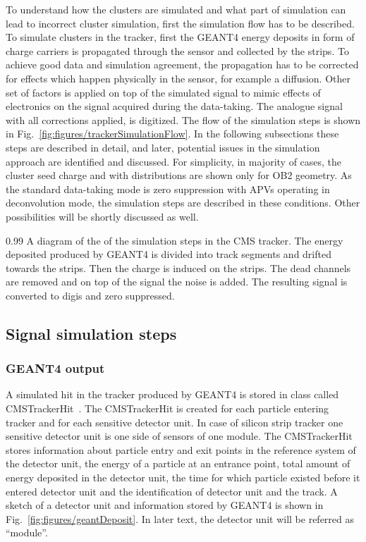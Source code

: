 To understand how the clusters are simulated and what part of simulation can lead to incorrect cluster simulation, first the simulation flow has to be described. To simulate clusters in the tracker, first the GEANT4 energy deposits in form of charge carriers is propagated through the sensor and collected by the strips. To achieve good data and simulation agreement, the propagation has to be corrected for effects which happen physically in the sensor, for example a diffusion. Other set of factors is applied on top of the simulated signal to mimic effects of electronics on the signal acquired during the data-taking. The analogue signal with all corrections applied, is digitized. The flow of the simulation steps is shown in Fig.~\ref{fig:figures/trackerSimulationFlow}. In the following subsections these steps are described in detail, and later, potential issues in the simulation approach are identified and discussed. For simplicity, in majority of cases, the cluster seed charge and with distributions are shown only for OB2 geometry. As the standard data-taking mode is zero suppression with APVs operating in deconvolution mode, the simulation steps are described in these conditions. Other possibilities will be shortly discussed as well.

                 {0.99}       %
                 { A diagram of the of the simulation steps in the CMS tracker. The energy deposited produced by GEANT4 is divided into track segments and drifted towards the strips. Then the charge is induced on the strips. The dead channels are removed and on top of the signal the noise is added. The resulting signal is converted to digis and zero suppressed. }

\subsection{Signal simulation steps}


\subsubsection{GEANT4 output}

A simulated hit in the tracker produced by GEANT4 is stored in class called CMSTrackerHit~\cite{Lefebure:1364020}. The CMSTrackerHit is created for each particle entering tracker and for each sensitive detector unit. In case of silicon strip tracker one sensitive detector unit is one side of sensors of one module. The CMSTrackerHit stores information about particle entry and exit points in the reference system of the detector unit, the energy of a particle at an entrance point, total amount of energy deposited in the detector unit, the time for which particle existed before it entered detector unit and the identification of detector unit and the track. A sketch of a detector unit and information stored by GEANT4 is shown in Fig.~\ref{fig:figures/geantDeposit}. In later text, the detector unit will be referred as ``module''.

